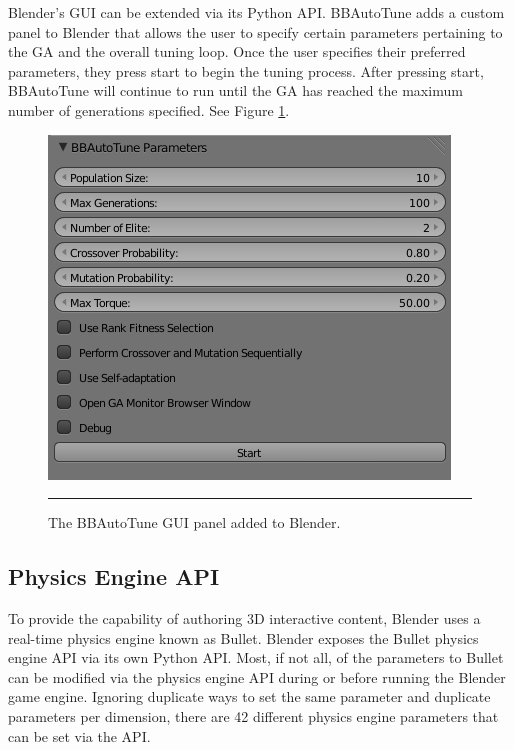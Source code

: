 Blender's GUI can be extended via its Python API. BBAutoTune adds a custom panel to Blender that allows the user to specify certain parameters pertaining to the GA and the overall tuning loop. Once the user specifies their preferred parameters, they press start to begin the tuning process. After pressing start, BBAutoTune will continue to run until the GA has reached the maximum number of generations specified. See Figure \ref{fig:bbautotune_gui}. 

\begin{figure}[htbp]
\centering
\includegraphics[scale=0.6]{../Figures/Chapter4/bbautotune_gui.png}
\rule{35em}{0.5pt}
\caption[BBAutoTune GUI Panel]{The BBAutoTune GUI panel added to Blender.}
\label{fig:bbautotune_gui}
\end{figure}

\subsection{Physics Engine API}

To provide the capability of authoring 3D interactive content, Blender uses a real-time physics engine known as Bullet. Blender exposes the Bullet physics engine API via its own Python API. Most, if not all, of the parameters to Bullet can be modified via the physics engine API during or before running the Blender game engine. Ignoring duplicate ways to set the same parameter and duplicate parameters per dimension, there are 42 different physics engine parameters that can be set via the API.


